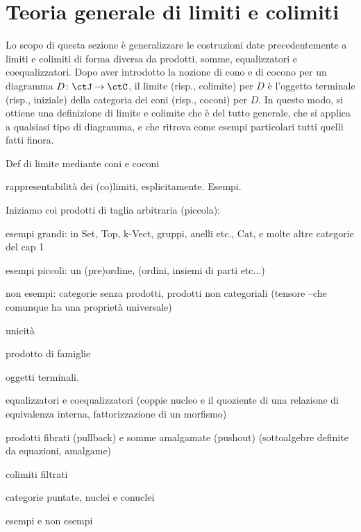 \section{Teoria generale di limiti e colimiti}

Lo scopo di questa sezione è generalizzare le costruzioni date precedentemente a limiti e colimiti di forma diversa da prodotti, somme, equalizzatori e coequalizzatori. Dopo aver introdotto la nozione di cono e di cocono per un diagramma $D \colon \ctJ \to\ctC$, il limite (risp., colimite) per $D$ è l'oggetto terminale (risp., iniziale) della categoria dei coni (risp., coconi) per $D$. In questo modo, si ottiene una definizione di limite e colimite che è del tutto generale, che si applica a qualsiasi tipo di diagramma, e che ritrova come esempi particolari tutti quelli fatti finora. 

Def di limite mediante coni e coconi

rappresentabilità dei (co)limiti, esplicitamente.
Esempi.

Iniziamo coi prodotti di taglia arbitraria (piccola):

esempi grandi: in Set, Top, k-Vect, gruppi, anelli etc., Cat, e molte altre categorie del cap 1

esempi piccoli: un (pre)ordine, (ordini, insiemi di parti etc...)

non esempi: categorie senza prodotti, prodotti non categoriali (tensore --che comunque ha una proprietà universale)

unicità

prodotto di famiglie

oggetti terminali.

equalizzatori e coequalizzatori (coppie nucleo e il quoziente di una relazione di equivalenza interna, fattorizzazione di un morfismo)

prodotti fibrati (pullback) e somme amalgamate (pushout) (sottoalgebre definite da equazioni, amalgame)

colimiti filtrati

categorie puntate, nuclei e conuclei

esempi e non esempi

